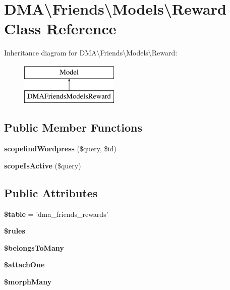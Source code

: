 \hypertarget{classDMA_1_1Friends_1_1Models_1_1Reward}{\section{D\+M\+A\textbackslash{}Friends\textbackslash{}Models\textbackslash{}Reward Class Reference}
\label{classDMA_1_1Friends_1_1Models_1_1Reward}
}
Inheritance diagram for D\+M\+A\textbackslash{}Friends\textbackslash{}Models\textbackslash{}Reward\+:\begin{figure}[H]
\begin{center}
\leavevmode
\includegraphics[height=2.000000cm]{d7/dc4/classDMA_1_1Friends_1_1Models_1_1Reward}
\end{center}
\end{figure}
\subsection*{Public Member Functions}
\begin{DoxyCompactItemize}
\item 
\hypertarget{classDMA_1_1Friends_1_1Models_1_1Reward_a672b475953c8ef5691e9c5a209204cfe}{{\bfseries scopefind\+Wordpress} (\$query, \$id)}\label{classDMA_1_1Friends_1_1Models_1_1Reward_a672b475953c8ef5691e9c5a209204cfe}

\item 
\hypertarget{classDMA_1_1Friends_1_1Models_1_1Reward_a9105978ce5ddcdc266d5023c047a72ce}{{\bfseries scope\+Is\+Active} (\$query)}\label{classDMA_1_1Friends_1_1Models_1_1Reward_a9105978ce5ddcdc266d5023c047a72ce}

\end{DoxyCompactItemize}
\subsection*{Public Attributes}
\begin{DoxyCompactItemize}
\item 
\hypertarget{classDMA_1_1Friends_1_1Models_1_1Reward_a99affaf28976dda4adc97dfe06a6c000}{{\bfseries \$table} = 'dma\+\_\+friends\+\_\+rewards'}\label{classDMA_1_1Friends_1_1Models_1_1Reward_a99affaf28976dda4adc97dfe06a6c000}

\item 
{\bfseries \$rules}
\item 
{\bfseries \$belongs\+To\+Many}
\item 
{\bfseries \$attach\+One}
\item 
{\bfseries \$morph\+Many}
\end{DoxyCompactItemize}
